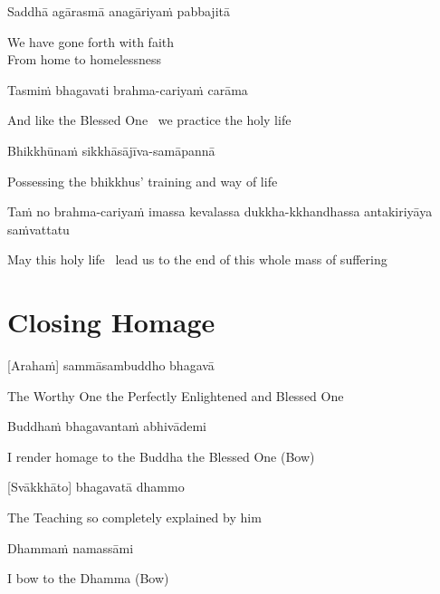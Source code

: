 Saddhā agārasmā anagāriyaṁ pabbajitā

\begin{english}
  We have gone forth with faith\\
  From home to homelessness
\end{english}

Tasmiṁ bhagavati brahma-cariyaṁ carāma

\begin{english}
  And like the Blessed One \breathmark\ we practice the holy life
\end{english}

Bhikkhūnaṁ sikkhāsājīva-samāpannā

\begin{english}
  Possessing the bhikkhus’ training and way of life
\end{english}

Taṁ no brahma-cariyaṁ imassa kevalassa dukkha-kkhandhassa antakiriyāya saṁvattatu

\begin{english}
  May this holy life \breathmark\ lead us to the end of this whole mass of suffering
\end{english}


\section{Closing Homage}
\label{closing-homage}

[Arahaṁ] sammāsambuddho bhagavā

\begin{english}
  The Worthy One the Perfectly Enlightened and Blessed One
\end{english}

Buddhaṁ bhagavantaṁ abhivādemi

\begin{english}
  I render homage to the Buddha the Blessed One \hfill{(Bow)}
\end{english}

[Svākkhāto] bhagavatā dhammo

\begin{english}
  The Teaching so completely explained by him
\end{english}

Dhammaṁ namassāmi

\begin{english}
  I bow to the Dhamma \hfill{(Bow)}
\end{english}

